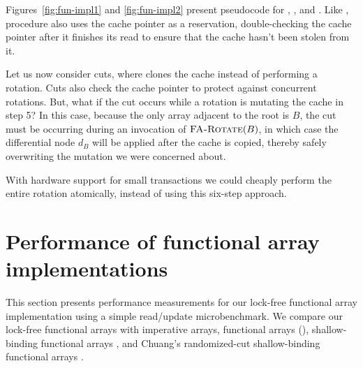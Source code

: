 Figures~\ref{fig:fun-impl1} and \ref{fig:fun-impl2} present pseudocode
for , , and
.  Like ,  procedure also uses the
cache pointer as a reservation, double-checking the cache pointer
after it finishes its read to ensure that the cache hasn't been stolen
from it.

Let us now consider cuts, where  clones the cache
instead of performing a rotation.   Cuts also check the cache pointer
to protect against concurrent rotations.  But, what if the cut occurs
while a rotation is mutating the cache in step 5?  In this case, because the
only array adjacent to the root is $B$, the cut must be occurring
during an invocation of $\text{\sc FA-Rotate}(B)$, in which case the
differential node $d_B$ will be applied after the cache is copied,
thereby safely overwriting the mutation we were concerned about.

With hardware support for small transactions \cite{HerlihyMo93}
we could cheaply perform the entire rotation atomically, instead of
using this six-step approach.






\section{Performance of functional array implementations}
This section presents performance measurements for our lock-free functional
array implementation using a simple read/update microbenchmark.  We
compare our lock-free functional arrays with imperative arrays, \naive
functional arrays (), shallow-binding functional
arrays \cite{Baker91}, and Chuang's randomized-cut shallow-binding
functional arrays \cite{Chuang94}.


